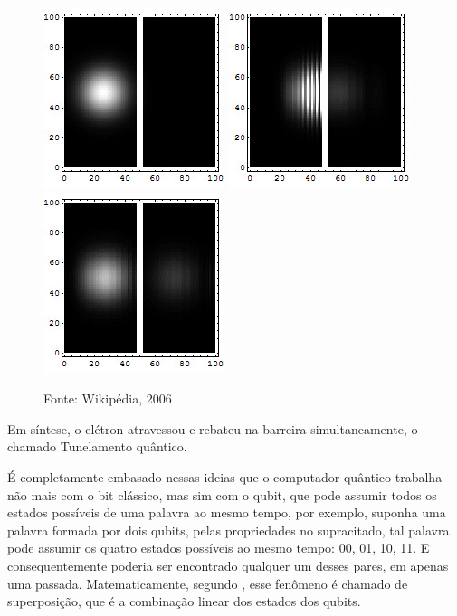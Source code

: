 \documentclass[
	12pt,				%
	oneside,			%
	a4paper,			%
	english,			%
	french,				%
	spanish,			%
	brazil,				%
	]{abntex2}
\begin{document}
\begin{figure}[h!]
	\centering
	\includegraphics[scale=1]{tunelj1.jpg}
	\includegraphics[scale=1]{tunelj2.jpg}
	\includegraphics[scale=1]{tunelj3.jpg}		
	\caption{Fonte: Wikipédia, 2006}
	\label{fig:tunel0}
\end{figure}

Em síntese, o elétron atravessou e rebateu na barreira simultaneamente, o chamado Tunelamento quântico.

É completamente embasado nessas ideias que o computador quântico trabalha não mais com o bit clássico, mas sim com o qubit, que pode assumir todos os estados possíveis de uma palavra ao mesmo tempo, por exemplo, suponha uma palavra formada por dois qubits, pelas propriedades no supracitado, tal palavra pode assumir os quatro estados possíveis ao mesmo tempo: 00, 01, 10, 11. E consequentemente poderia ser encontrado qualquer um desses pares, em apenas uma passada. Matematicamente, segundo \cite{nielsen:2010}, esse fenômeno é chamado de superposição, que é a combinação linear dos estados dos qubits.
\end{document}
